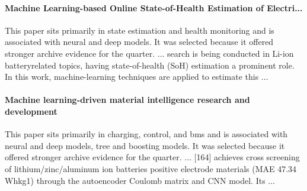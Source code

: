 \documentclass[conference]{IEEEtran}
\begin{document}
\paragraph{Machine Learning-based Online State-of-Health Estimation of Electri...} This paper sits primarily in state estimation and health monitoring and is associated with neural and deep models. It was selected because it offered stronger archive evidence for the quarter. ... search is being conducted in Li-ion batteryrelated topics, having state-of-health (SoH) estimation a prominent role. In this work, machine-learning techniques are applied to estimate this ... \cite{machinelearningbased2021}

\paragraph{Machine learning-driven material intelligence research and development} This paper sits primarily in charging, control, and bms and is associated with neural and deep models, tree and boosting models. It was selected because it offered stronger archive evidence for the quarter. ... [164] achieves cross screening of lithium/zinc/aluminum ion batteries positive electrode materials (MAE 47.34 Whkg1) through the autoencoder Coulomb matrix and CNN model. Its ... \cite{machinelearningdriven2025}
\end{document}
